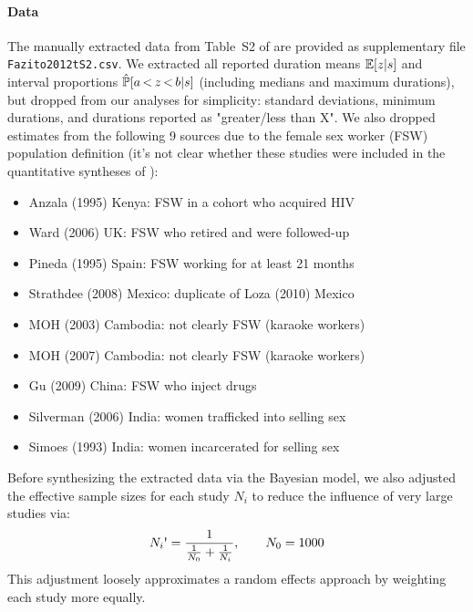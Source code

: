 \paragraph{Data}
The manually extracted data from Table~S2 of \citep{Fazito2012}
are provided as supplementary file \texttt{Fazito2012tS2.csv}.
We extracted all reported duration means $\mathbb{E}[z|s]$ and
interval proportions $\hat{\mathbb{P}}[a\,{<}\,z\,{<}\,b|s]$ (including medians and maximum durations),
but dropped from our analyses for simplicity:
standard deviations, minimum durations, and durations reported as "greater/less than X".
We also dropped estimates from the following 9 sources
due to the female sex worker (FSW) population definition
(it's not clear whether these studies were included
 in the quantitative syntheses of \citep{Fazito2012}):
\begin{itemize}[parsep=0pt]
  \item Anzala (1995) Kenya: FSW in a cohort who acquired HIV
  \item Ward (2006) UK: FSW who retired and were followed-up
  \item Pineda (1995) Spain: FSW working for at least 21 months
  \item Strathdee (2008) Mexico: duplicate of Loza (2010) Mexico
  \item MOH (2003) Cambodia: not clearly FSW (\eg karaoke workers)
  \item MOH (2007) Cambodia: not clearly FSW (\eg karaoke workers)
  \item Gu (2009) China: FSW who inject drugs
  \item Silverman (2006) India: women trafficked into selling sex
  \item Simoes (1993) India: women incarcerated for selling sex
\end{itemize}
\par
Before synthesizing the extracted data via the Bayesian model,
we also adjusted the effective sample sizes for each study $N_i$
to reduce the influence of very large studies via:
\begin{equation}
  \Ni = \frac{1}{\frac{1}{N_0}+\frac{1}{N_i}}
  ,\qquad N_0 = 1000
  \label{eq:n.adj}
\end{equation}
This adjustment loosely approximates a random effects approach
by weighting each study more equally.
